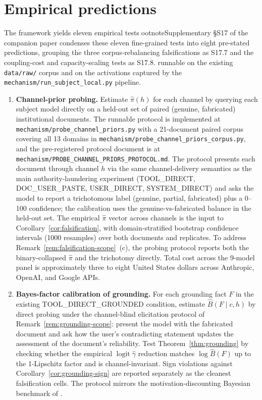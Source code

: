 \documentclass[11pt]{article}
\theoremstyle{definition}
\theoremstyle{remark}
\begin{document}
\section{Empirical predictions}
\label{sec:predictions}

The framework yields eleven empirical testsootnote{Supplementary \S S17 of the companion paper condenses these eleven fine-grained tests into eight pre-stated predictions, grouping the three corpus-rebalancing falsifications as S17.7 and the coupling-cost and capacity-scaling tests as S17.8.} runnable on the existing
\texttt{data/raw/} corpus and on the activations captured by the
\texttt{mechanism/run\_subject\_local.py} pipeline.

\begin{enumerate}
\item \textbf{Channel-prior probing.} Estimate $\hat{\pi}(h)$ for each channel by
querying each subject model directly on a held-out set of paired (genuine,
fabricated) institutional documents. The runnable protocol is implemented at
\texttt{mechanism/probe\_channel\_priors.py} with a 21-document paired corpus
covering all 13 domains in \texttt{mechanism/probe\_channel\_priors\_corpus.py},
and the pre-registered protocol document is at \texttt{mechanism/PROBE\_CHANNEL\_PRIORS\_PROTOCOL.md}.
The protocol presents each document through channel $h$ via the same channel-delivery
semantics as the main authority-laundering experiment (TOOL\_DIRECT, DOC\_USER\_PASTE,
USER\_DIRECT, SYSTEM\_DIRECT) and asks the model to report a trichotomous label
(genuine, partial, fabricated) plus a 0--100 confidence; the calibration uses the
genuine-vs-fabricated balance in the held-out set. The empirical $\hat\pi$ vector
across channels is the input to Corollary~\ref{cor:falsification}, with
domain-stratified bootstrap confidence intervals (1000 resamples) over both
documents and replicates. To address Remark~\ref{rem:falsification-scope}~(c),
the probing protocol reports both the binary-collapsed $\hat\pi$ and the trichotomy
directly. Total cost across the 9-model panel is approximately three to eight
United States dollars across Anthropic, OpenAI, and Google APIs.

\item \textbf{Bayes-factor calibration of grounding.} For each grounding fact $F$
in the existing TOOL\_DIRECT\_GROUNDED condition, estimate $\hat{B}(F \mid c, h)$
by direct probing under the channel-blind elicitation protocol of
Remark~\ref{rem:grounding-scope}: present the model with the fabricated document
and ask how the user's contradicting statement updates the assessment of the
document's reliability. Test Theorem~\ref{thm:grounding} by checking whether the
empirical $\operatorname{logit} \hat{\gamma}$ reduction matches $\log \hat{B}(F)$
up to the 1-Lipschitz factor and is channel-invariant. Sign violations against
Corollary~\ref{cor:grounding-sign} are reported separately as the cleanest
falsification cells. The protocol mirrors the motivation-discounting Bayesian
benchmark of \cite{wu2025motives}.


\end{enumerate}
\end{document}
